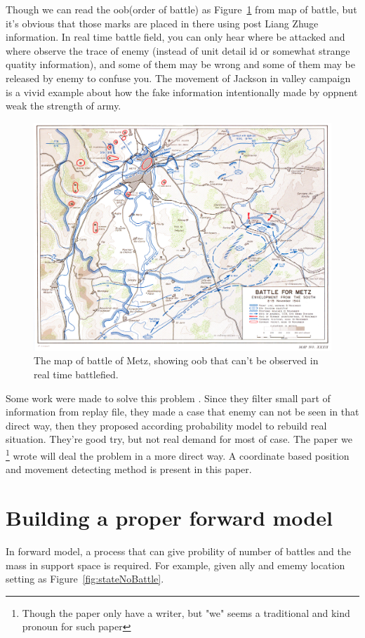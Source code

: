 \documentclass{article}
\begin{document}
Though we can read the oob(order of battle) as Figure~\ref{fig:metz} from map of battle, but it's obvious that those marks are 
placed in there using post Liang Zhuge information. In real time battle field, you can only hear where
be attacked and where observe the trace of enemy (instead of unit detail id or somewhat strange quatity
information), and some of them may be wrong and some of them may be released by enemy to confuse you.
The movement of Jackson in valley campaign is a vivid example about how the fake information intentionally
made by oppnent weak the strength of army.

\begin{figure}[h!]
\includegraphics[width=0.6\linewidth]{metz.jpg}
\caption{The map of battle of Metz, showing oob that can't be observed in real time battlefied. }
\label{fig:metz}
\end{figure}


Some work were made to solve this problem 
\cite{hostetler2012inferring} \cite{vsmejkal2016integrating} \cite{touhou}.
Since they filter small part of information from replay file, they made a case that enemy can not be 
seen in that direct way, then they proposed according probability model to rebuild real situation.
They're good try, but not real demand for most of case. The paper we
\footnote{Though the paper only have a writer, but "we" seems a traditional and kind pronoun for such paper} 
wrote will deal the problem in a more direct way. 
A coordinate based position and movement detecting method is present in this paper.

\section{Building a proper forward model}


In forward model, a process that can give probility of number of battles and the mass in support space 
is required. For example, given ally and ememy location setting as Figure~\ref{fig:stateNoBattle}.
\end{document}
